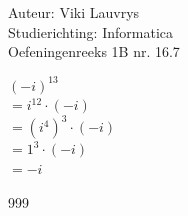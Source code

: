 \documentclass[a4paper]{article}
\begin{document}
  
\noindent \large Auteur: Viki Lauvrys        \\
\noindent \large Studierichting: Informatica \\
\noindent \large Oefeningenreeks 1B nr. 16.7 \\

\medskip

\normalsize

$ ( -i )^{13} $ \\

$ = i^{12} \cdot (-i) $ \\

$ = \left(i^4\right)^3 \cdot (-i) $ \\

$ = 1^3 \cdot (-i) $ \\

$ = -i $ \\

\begin{thebibliography}{999}
\end{thebibliography}
\end{document}
